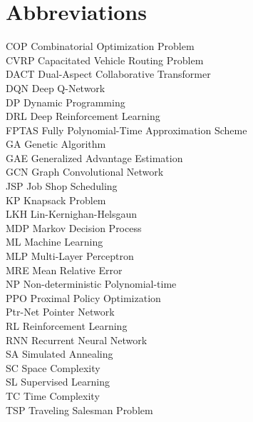 \chapter*{Abbreviations}

\begin{flushleft}

COP \hfill Combinatorial Optimization Problem \\
CVRP \hfill Capacitated Vehicle Routing Problem \\
DACT \hfill Dual-Aspect Collaborative Transformer \\
DQN \hfill Deep Q-Network \\
DP \hfill Dynamic Programming \\
DRL \hfill Deep Reinforcement Learning \\
FPTAS \hfill Fully Polynomial-Time Approximation Scheme \\
GA \hfill Genetic Algorithm \\
GAE \hfill Generalized Advantage Estimation \\
GCN \hfill Graph Convolutional Network \\
JSP \hfill Job Shop Scheduling \\
KP \hfill Knapsack Problem \\
LKH \hfill Lin-Kernighan-Helsgaun \\
MDP \hfill Markov Decision Process \\
ML \hfill Machine Learning \\
MLP \hfill Multi-Layer Perceptron \\
MRE \hfill Mean Relative Error \\
NP \hfill Non-deterministic Polynomial-time \\
PPO \hfill Proximal Policy Optimization \\
Ptr-Net \hfill Pointer Network \\
RL \hfill Reinforcement Learning \\
RNN \hfill Recurrent Neural Network \\
SA \hfill Simulated Annealing \\
SC \hfill Space Complexity \\
SL \hfill Supervised Learning \\
TC \hfill Time Complexity \\
TSP \hfill Traveling Salesman Problem \\

\end{flushleft}